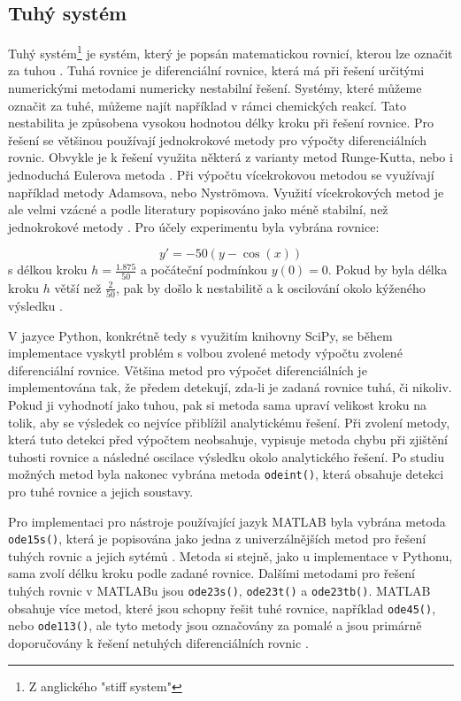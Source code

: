 \subsection{Tuhý systém}
Tuhý systém\footnote{Z anglického "stiff system"} je systém, který je popsán matematickou rovnicí, kterou lze označit za tuhou \cite{hairer}. Tuhá rovnice je diferenciální rovnice, která má při řešení určitými numerickými metodami numericky nestabilní řešení. Systémy, které můžeme označit za tuhé, můžeme najít například v rámci chemických reakcí. Tato nestabilita je způsobena vysokou hodnotou délky kroku při řešení rovnice. Pro řešení se většinou používají jednokrokové metody pro výpočty diferenciálních rovnic. Obvykle je k řešení využita některá z varianty metod Runge-Kutta, nebo i jednoduchá Eulerova metoda \cite{IMS-skripta}. Při výpočtu vícekrokovou metodou se využívají například metody Adamsova, nebo Nyströmova. Využití vícekrokových metod je ale velmi vzácné a podle literatury popisováno jako méně stabilní, než jednokrokové metody \cite{hairer}. Pro účely experimentu byla vybrána rovnice:

\begin{equation}
    y' = -50(y - \cos{(x)})
\end{equation}
s délkou kroku $h = \frac{1.875}{50}$ a počáteční podmínkou $y(0) = 0$. Pokud by byla délka kroku $h$ větší než $\frac{2}{50}$, pak by došlo k nestabilitě a k oscilování okolo kýženého výsledku \cite{hairer}.

V jazyce Python, konkrétně tedy s využitím knihovny SciPy, se během implementace vyskytl problém s volbou zvolené metody výpočtu zvolené diferenciální rovnice. Většina metod pro výpočet diferenciálních je implementována tak, že předem detekují, zda-li je zadaná rovnice tuhá, či nikoliv. Pokud ji vyhodnotí jako tuhou, pak si metoda sama upraví velikost kroku na tolik, aby se výsledek co nejvíce přiblížil analytickému řešení. Při zvolení metody, která tuto detekci před výpočtem neobsahuje, vypisuje metoda chybu při zjištění tuhosti rovnice a následné oscilace výsledku okolo analytického řešení. Po studiu možných metod byla nakonec vybrána metoda \texttt{odeint()}, která obsahuje detekci pro tuhé rovnice a jejich soustavy.


Pro implementaci pro nástroje používající jazyk MATLAB byla vybrána metoda \texttt{ode15s()}, která je popisována jako jedna z univerzálnějších metod pro řešení tuhých rovnic a jejich sytémů \cite{MATLAB:2010}. Metoda si stejně, jako u implementace v Pythonu, sama zvolí délku kroku podle zadané rovnice. Dalšími metodami pro řešení tuhých rovnic v MATLABu jsou \texttt{ode23s()}, \texttt{ode23t()} a \texttt{ode23tb()}. MATLAB obsahuje více metod, které jsou schopny řešit tuhé rovnice, například \texttt{ode45()}, nebo \texttt{ode113()}, ale tyto metody jsou označovány za pomalé a jsou primárně doporučovány k řešení netuhých diferenciálních rovnic \cite{MATLAB:2010}.

